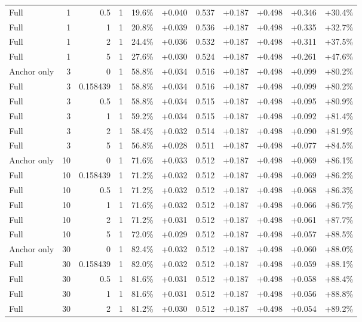 \begin{table}[htbp]
\begin{tabular}{lrrrccccccc}
Full & 1 & 0.5 & 1 & 19.6\% & +0.040 & 0.537 & +0.187 & +0.498 & +0.346 & +30.4\% \\
Full & 1 & 1 & 1 & 20.8\% & +0.039 & 0.536 & +0.187 & +0.498 & +0.335 & +32.7\% \\
Full & 1 & 2 & 1 & 24.4\% & +0.036 & 0.532 & +0.187 & +0.498 & +0.311 & +37.5\% \\
Full & 1 & 5 & 1 & 27.6\% & +0.030 & 0.524 & +0.187 & +0.498 & +0.261 & +47.6\% \\
Anchor only & 3 & 0 & 1 & 58.8\% & +0.034 & 0.516 & +0.187 & +0.498 & +0.099 & +80.2\% \\
Full & 3 & 0.158439 & 1 & 58.8\% & +0.034 & 0.516 & +0.187 & +0.498 & +0.099 & +80.2\% \\
Full & 3 & 0.5 & 1 & 58.8\% & +0.034 & 0.515 & +0.187 & +0.498 & +0.095 & +80.9\% \\
Full & 3 & 1 & 1 & 59.2\% & +0.034 & 0.515 & +0.187 & +0.498 & +0.092 & +81.4\% \\
Full & 3 & 2 & 1 & 58.4\% & +0.032 & 0.514 & +0.187 & +0.498 & +0.090 & +81.9\% \\
Full & 3 & 5 & 1 & 56.8\% & +0.028 & 0.511 & +0.187 & +0.498 & +0.077 & +84.5\% \\
Anchor only & 10 & 0 & 1 & 71.6\% & +0.033 & 0.512 & +0.187 & +0.498 & +0.069 & +86.1\% \\
Full & 10 & 0.158439 & 1 & 71.2\% & +0.032 & 0.512 & +0.187 & +0.498 & +0.069 & +86.2\% \\
Full & 10 & 0.5 & 1 & 71.2\% & +0.032 & 0.512 & +0.187 & +0.498 & +0.068 & +86.3\% \\
Full & 10 & 1 & 1 & 71.6\% & +0.032 & 0.512 & +0.187 & +0.498 & +0.066 & +86.7\% \\
Full & 10 & 2 & 1 & 71.2\% & +0.031 & 0.512 & +0.187 & +0.498 & +0.061 & +87.7\% \\
Full & 10 & 5 & 1 & 72.0\% & +0.029 & 0.512 & +0.187 & +0.498 & +0.057 & +88.5\% \\
Anchor only & 30 & 0 & 1 & 82.4\% & +0.032 & 0.512 & +0.187 & +0.498 & +0.060 & +88.0\% \\
Full & 30 & 0.158439 & 1 & 82.0\% & +0.032 & 0.512 & +0.187 & +0.498 & +0.059 & +88.1\% \\
Full & 30 & 0.5 & 1 & 81.6\% & +0.031 & 0.512 & +0.187 & +0.498 & +0.058 & +88.4\% \\
Full & 30 & 1 & 1 & 81.6\% & +0.031 & 0.512 & +0.187 & +0.498 & +0.056 & +88.8\% \\
Full & 30 & 2 & 1 & 81.2\% & +0.030 & 0.512 & +0.187 & +0.498 & +0.054 & +89.2\% \\

\end{tabular}
\end{table}
